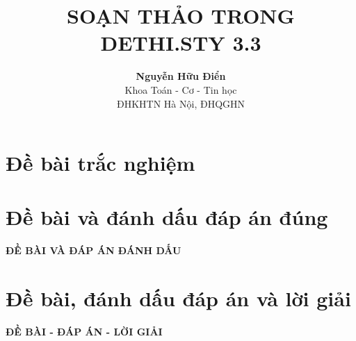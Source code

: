 \documentclass[11pt,openany]{article}
\begin{document}
\soanthao

\title{\bf SOẠN THẢO TRONG DETHI.STY 3.3} %
\author{{\bf Nguyễn Hữu Điển}\\
Khoa Toán - Cơ - Tin học\\
ĐHKHTN Hà Nội, ĐHQGHN
} %
\date{} %

\maketitle
\vspace*{1cm}

\tableofcontents

\newpage
\section{Đề bài trắc nghiệm}
 \lamtieude
\indebai
 

\newpage
\section{Đề bài và đánh dấu đáp án đúng}
\setcounter{page}{1}
\setcounter{question}{0}
\lamtieude
\indebaidapan
\begin{center}
{\bf ĐỀ BÀI VÀ ĐÁP ÁN ĐÁNH DẤU}
\end{center}

 

\newpage
\section{Đề bài, đánh dấu đáp án và lời giải }
\setcounter{page}{1}
\setcounter{question}{0}
\indebailoigiai
\begin{center}
{\bf ĐỀ BÀI - ĐÁP ÁN - LỜI GIẢI}
\end{center}
 
\setlength{\labelsep}{30pt}
\end{document}
